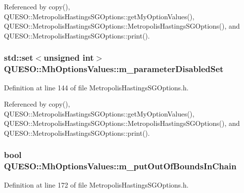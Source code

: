 Referenced by copy(), Q\-U\-E\-S\-O\-::\-Metropolis\-Hastings\-S\-G\-Options\-::get\-My\-Option\-Values(), Q\-U\-E\-S\-O\-::\-Metropolis\-Hastings\-S\-G\-Options\-::\-Metropolis\-Hastings\-S\-G\-Options(), and Q\-U\-E\-S\-O\-::\-Metropolis\-Hastings\-S\-G\-Options\-::print().

\hypertarget{class_q_u_e_s_o_1_1_mh_options_values_a88f45c280bb77a8a48d47504b8d9e898}{
\subsubsection[{m\-\_\-parameter\-Disabled\-Set}]{\setlength{\rightskip}{0pt plus 5cm}std\-::set$<$unsigned int$>$ Q\-U\-E\-S\-O\-::\-Mh\-Options\-Values\-::m\-\_\-parameter\-Disabled\-Set}}\label{class_q_u_e_s_o_1_1_mh_options_values_a88f45c280bb77a8a48d47504b8d9e898}


Definition at line 144 of file Metropolis\-Hastings\-S\-G\-Options.\-h.



Referenced by copy(), Q\-U\-E\-S\-O\-::\-Metropolis\-Hastings\-S\-G\-Options\-::get\-My\-Option\-Values(), Q\-U\-E\-S\-O\-::\-Metropolis\-Hastings\-S\-G\-Options\-::\-Metropolis\-Hastings\-S\-G\-Options(), and Q\-U\-E\-S\-O\-::\-Metropolis\-Hastings\-S\-G\-Options\-::print().

\hypertarget{class_q_u_e_s_o_1_1_mh_options_values_a6500d388ce724964ed858174a454177a}{
\subsubsection[{m\-\_\-put\-Out\-Of\-Bounds\-In\-Chain}]{\setlength{\rightskip}{0pt plus 5cm}bool Q\-U\-E\-S\-O\-::\-Mh\-Options\-Values\-::m\-\_\-put\-Out\-Of\-Bounds\-In\-Chain}}\label{class_q_u_e_s_o_1_1_mh_options_values_a6500d388ce724964ed858174a454177a}


Definition at line 172 of file Metropolis\-Hastings\-S\-G\-Options.\-h.



